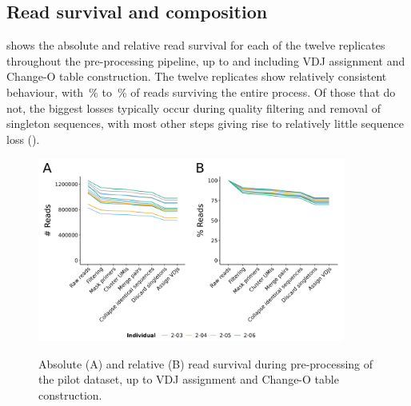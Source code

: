 \subsection{Read survival and composition}
\label{sec:igseq_pilot_composition}

 shows the absolute and relative read survival for each of the twelve replicates throughout the pre-processing pipeline, up to and including VDJ assignment and Change-O table construction. The twelve replicates show relatively consistent behaviour, with \,\% to \,\% of reads surviving the entire process. Of those that do not, the biggest losses typically occur during quality filtering and removal of singleton sequences, with most other steps giving rise to relatively little sequence loss ().

\begin{figure}
\centering
\includegraphics[width = 0.9\textwidth]{_Figures/png/pilot-read-survival-init.png}
\begin{subfigure}{0em}
\label{fig:igseq-pilot-read-survival-init-a}
\end{subfigure}
\begin{subfigure}{0em}
\label{fig:igseq-pilot-read-survival-init-b}
\end{subfigure}
\caption{Absolute (A) and relative (B) read survival during pre-processing of the pilot \igseq dataset, up to VDJ assignment and Change-O table construction.}
\label{fig:igseq-pilot-read-survival-init}
\end{figure}

